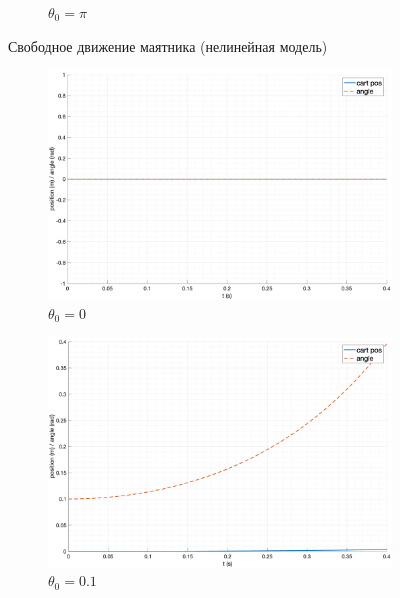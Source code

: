 \begin{figure}[ht!]
\begin{subfigure}[b]{0.45\textwidth}
        \caption{$\theta_0 = \pi$}
    \end{subfigure}
    \caption{Свободное движение маятника (нелинейная модель)}
    \label{fig:free_motion_nonlinear}
\end{figure}

\begin{figure}[ht!]
    \centering
    \begin{subfigure}[b]{0.45\textwidth}
        \includegraphics[width=\textwidth]{media/plots/free_motion/lin_1.png}
        \caption{$\theta_0 = 0$}
  \end{subfigure}
    \begin{subfigure}[b]{0.45\textwidth}
        \includegraphics[width=\textwidth]{media/plots/free_motion/lin_2.png}
        \caption{$\theta_0 = 0.1$}
    \end{subfigure}
    \begin{subfigure}[b]{0.45\textwidth}

\end{subfigure}
\end{figure}
